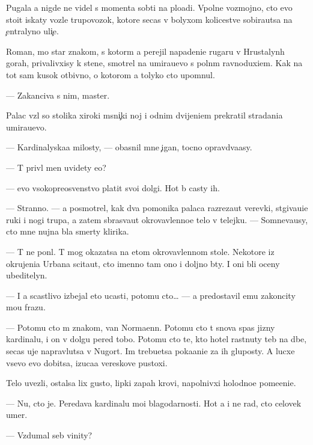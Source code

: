 \documentclass[10pt]{book}
\begin{document}
Pugala {\y}a nigde ne videl s momenta sob{\yi}ti{\y} na plo{\x}adi. Vpolne vozmojno, cto {\y}evo sto{\y}it iskaty vozle trupovozok, kotor{\yi}{\y}e se{\y}cas v bolyxom kolicestve sobira{\y}utsa na {\c}entralyno{\y} uli{\c}e.

Roman, mo{\y} star{\yi}{\y} znakom{\yi}{\y}, s kotor{\yi}m {\y}a perejil napadeni{\y}e rugaru v Hrustalyn{\yi}h gorah, privalivxisy k stene, smotrel na umira{\y}u{\x}evo s poln{\yi}m ravnoduxi{\y}em. Kak na tot sam{\yi}{\y} kusok otbivno{\y}, o kotorom {\y}a tolyko cto upom{\ia}nul.

— Zakanciva{\y} s nim, master.

Palac vz{\ia}l so stolika xiroki{\y} m{\ia}sni{\c}ki{\y} noj i odnim dvijeni{\y}em prekratil stradani{\y}a umira{\y}u{\x}evo.

— Kardinalyska{\y}a milosty, — ob{\y}asnil mne {\c}igan, tocno opravd{\yi}va{\y}asy.

— T{\yi} priv{\e}l men{\ia} uvidety {\y}e{\y}o?

— {\Y}evo v{\yi}sokopreosv{\ia}{\x}enstvo platit svo{\y}i dolgi. Hot{\ia} b{\yi} casty ih.

— Stranno. — {\Y}a posmotrel, kak dva pomo{\x}nika palaca razreza{\y}ut verevki, st{\ia}giva{\y}u{\x}i{\y}e ruki i nogi trupa, a zatem sbras{\yi}va{\y}ut okrovavlenno{\y}e telo v telejku. — Somneva{\y}usy, cto mne nujna b{\yi}la smerty klirika.

— T{\yi} ne pon{\ia}l. T{\yi} mog okazatsa na etom okrovavlennom stole. Nekotor{\yi}{\y}e iz okrujeni{\y}a Urbana scita{\y}ut, cto imenno tam ono i doljno b{\yi}ty. I oni b{\yi}li oceny ubeditelyn{\yi}.

— I {\y}a scastlivo izbejal eto{\y} ucasti, potomu cto… — {\Y}a predostavil {\y}emu zakoncity mo{\y}u frazu.

— Potomu cto m{\yi} znakom{\yi}, van Normaenn. Potomu cto t{\yi} snova spas jizny kardinalu, i on v dolgu pered tobo{\y}. Potomu cto te, kto hotel rast{\ia}nuty teb{\ia} na d{\yi}be, se{\y}cas uje napravl{\ia}{\y}utsa v N{\y}ugort. Im trebu{\y}etsa poka{\y}ani{\y}e za ih gluposty. A lucxe vsevo {\y}evo dobitsa, izuca{\y}a vereskov{\yi}{\y}e pustoxi.

Telo uvezli, ostalsa lix gusto{\y}, lipki{\y} zapah krovi, napolnivxi{\y} holodno{\y}e pome{\x}eni{\y}e.

— Nu, cto je. Peredava{\y} kardinalu mo{\y}i blagodarnosti. Hot{\ia} {\y}a i ne rad, cto celovek umer.

— Vzdumal seb{\ia} vinity?
\end{document}
